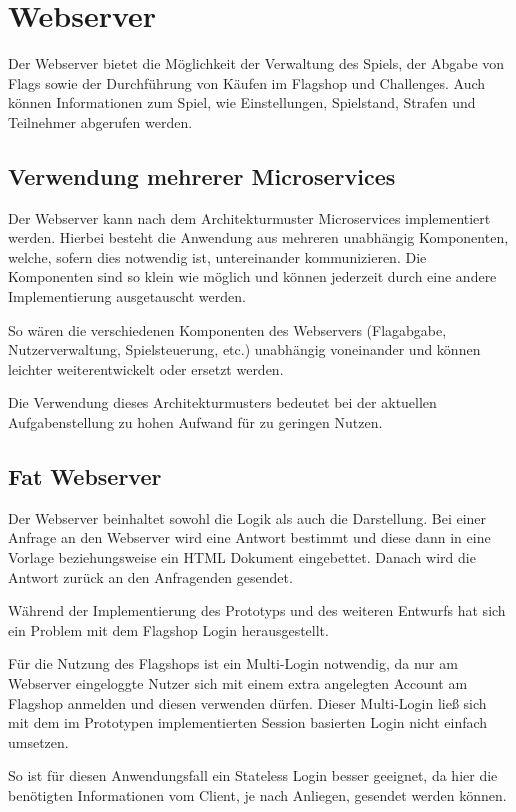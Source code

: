 \section{Webserver} \label{sec:Webserver}
Der Webserver bietet die Möglichkeit der Verwaltung des Spiels, der Abgabe von Flags sowie der Durchführung von Käufen im Flagshop und Challenges. Auch können Informationen zum Spiel, wie Einstellungen, Spielstand, Strafen und Teilnehmer abgerufen werden.

\subsection{Verwendung mehrerer Microservices}
Der Webserver kann nach dem Architekturmuster Microservices implementiert werden. Hierbei besteht die Anwendung aus mehreren unabhängig Komponenten, welche, sofern dies notwendig ist, untereinander kommunizieren. Die Komponenten sind so klein wie möglich und können jederzeit durch eine andere Implementierung ausgetauscht werden. \cite{wolffMicroservicesGrundlagenFlexibler2015} 

So wären die verschiedenen Komponenten des Webservers (Flagabgabe, Nutzerverwaltung, Spielsteuerung, etc.) unabhängig voneinander und können leichter weiterentwickelt oder ersetzt werden.

Die Verwendung dieses Architekturmusters bedeutet bei der aktuellen Aufgabenstellung zu hohen Aufwand für zu geringen Nutzen.

\subsection{Fat Webserver}
Der Webserver beinhaltet sowohl die Logik als auch die Darstellung. Bei einer Anfrage an den Webserver wird eine Antwort bestimmt und diese dann in eine Vorlage beziehungsweise ein HTML Dokument eingebettet. Danach wird die Antwort zurück an den Anfragenden gesendet.

Während der Implementierung des Prototyps und des weiteren Entwurfs hat sich ein Problem mit dem Flagshop Login herausgestellt.

Für die Nutzung des Flagshops ist ein Multi-Login notwendig, da nur am Webserver eingeloggte Nutzer sich mit einem extra angelegten Account am Flagshop anmelden und diesen verwenden dürfen. Dieser Multi-Login ließ sich mit dem im Prototypen implementierten Session basierten Login nicht einfach umsetzen. 

So ist für diesen Anwendungsfall ein Stateless Login besser geeignet, da hier die benötigten Informationen vom Client, je nach Anliegen, gesendet werden können. 

